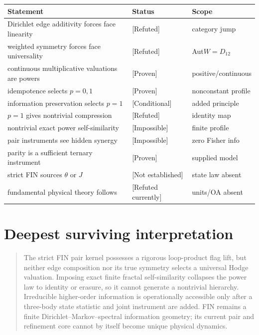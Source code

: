 \documentclass[11pt,a4paper]{article}
\newcommand{\status}[1]{\textsf{[#1]}}
\begin{document}
\begin{longtable}{@{}p{}p{}p{}@{}}
\toprule
Statement & Status & Scope \\
\midrule\endhead
Dirichlet edge additivity forces face linearity & \status{Refuted} & category jump \\
weighted symmetry forces face universality & \status{Refuted} & Aut\(W=D_{12}\) \\
continuous multiplicative valuations are powers & \status{Proven} & positive/continuous \\
idempotence selects \(p=0,1\) & \status{Proven} & nonconstant profile \\
information preservation selects \(p=1\) & \status{Conditional} & added principle \\
\(p=1\) gives nontrivial compression & \status{Refuted} & identity map \\
nontrivial exact power self-similarity & \status{Impossible} & finite profile \\
pair instruments see hidden synergy & \status{Impossible} & zero Fisher info \\
parity is a sufficient ternary instrument & \status{Proven} & supplied model \\
strict FIN sources \(\theta\) or \(J\) & \status{Not established} & state law absent \\
fundamental physical theory follows & \status{Refuted currently} & units/OA absent \\
\bottomrule
\end{longtable}

\section{Deepest surviving interpretation}

\begin{quote}
The strict FIN pair kernel possesses a rigorous loop-product flag lift, but
neither edge composition nor its true symmetry selects a universal Hodge
valuation.  Imposing exact finite fractal self-similarity collapses the power
law to identity or erasure, so it cannot generate a nontrivial hierarchy.
Irreducible higher-order information is operationally accessible only after a
three-body state statistic and joint instrument are added.  FIN remains a
finite Dirichlet--Markov--spectral information geometry; its current pair and
refinement core cannot by itself become unique physical dynamics.
\end{quote}
\end{document}

